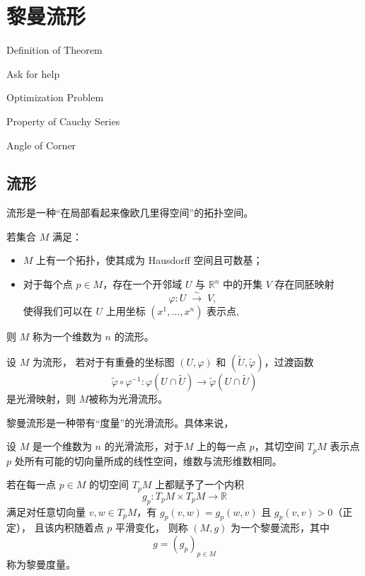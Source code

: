 \chapter{ 黎曼流形}
 \begin{introduction}
  \item Definition of Theorem
  \item Ask for help
  \item Optimization Problem
  \item Property of Cauchy Series
  \item Angle of Corner
\end{introduction}

\section{流形 }
流形是一种“在局部看起来像欧几里得空间”的拓扑空间。  
\begin{definition}[流形，Manifold]
若集合 $M$ 满足：
\begin{itemize}
  \item $M$ 上有一个拓扑，使其成为 Hausdorff 空间且可数基；  
  \item 对于每个点 $p\in M$，存在一个开邻域 $U$ 与 $\mathbb{R}^n$ 中的开集 $V$ 存在同胚映射
  $$
    \varphi:U\;\xrightarrow{\;\sim\;}\;V,
  $$
  使得我们可以在 $U$ 上用坐标 $(x^1,\dots,x^n)$ 表示点,
  \end{itemize}
  则 $M$ 称为一个维数为 \(n\) 的流形。 
    \end{definition}
  
  \begin{definition}
设 $M$ 为流形， 若对于有重叠的坐标图 $(U,\varphi)$ 和 $(\tilde U,\tilde\varphi)$，过渡函数
  $$
    \tilde\varphi\circ\varphi^{-1}:
    \varphi(U\cap\tilde U)\longrightarrow
    \tilde\varphi(U\cap\tilde U)
  $$
  是光滑映射，则 $M$被称为光滑流形。
\end{definition}

黎曼流形是一种带有“度量”的光滑流形。具体来说，
\begin{definition}

设 $M$ 是一个维数为 \(n\) 的光滑流形，对于\(M\) 上的每一点 \(p\)，其切空间 \(T_pM\) 表示点 \(p\) 处所有可能的切向量所成的线性空间，维数与流形维数相同。  

若在每一点 \(p\in M\) 的切空间 $T_pM$ 上都赋予了一个内积 
$$g_p: T_pM\times T_pM\to\mathbb{R}$$
满足对任意切向量 $v,w\in T_pM$，有 $g_p(v,w)=g_p(w,v)$ 且 $g_p(v,v)>0$（正定），
且该内积随着点 $p$ 平滑变化，
则称 \((M,g)\) 为一个黎曼流形，其中 
$$g=(g_p)_{p\in M}$$ 
称为黎曼度量。
\end{definition}
 
